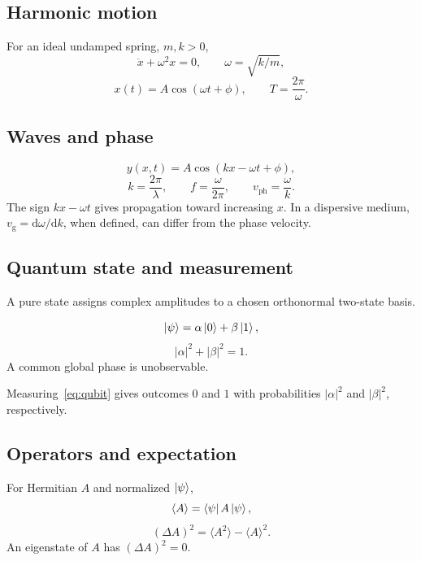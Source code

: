 \begin{referencecolumns}
\begin{referenceentry}
\section{Harmonic motion}
For an ideal undamped spring, $m,k>0$,
\[
\ddot x+\omega^2x=0,\qquad \omega=\sqrt{k/m},
\]
\[
x(t)=A\cos(\omega t+\phi),\qquad T=\frac{2\pi}{\omega}.
\]
\begin{referenceqa}
\end{referenceqa}
\end{referenceentry}

\begin{referenceentry}
\section{Waves and phase}
\[
y(x,t)=A\cos(kx-\omega t+\phi),
\]
\[
k=\frac{2\pi}{\lambda},\qquad f=\frac{\omega}{2\pi},\qquad
v_{\mathrm{ph}}=\frac{\omega}{k}.
\]
The sign $kx-\omega t$ gives propagation toward increasing $x$.
In a dispersive medium, $v_{\mathrm g}=\mathrm d\omega/\mathrm dk$, when defined,
can differ from the phase velocity.
\end{referenceentry}

\begin{referenceentry}
\section{Quantum state and measurement}
A pure state assigns complex amplitudes to a chosen orthonormal two-state basis.
\begin{referenceformula}
\begin{equation}\label{eq:qubit}
\left|\psi\right\rangle=\alpha\left|0\right\rangle+\beta\left|1\right\rangle,
\end{equation}
\[
|\alpha|^2+|\beta|^2=1.
\]
A common global phase is unobservable.
\end{referenceformula}
Measuring~\eqref{eq:qubit} gives outcomes $0$ and $1$ with probabilities
$|\alpha|^2$ and $|\beta|^2$, respectively.
\subsection{Operators and expectation}
For Hermitian $A$ and normalized $\left|\psi\right\rangle$,
\[
\langle A\rangle=\left\langle\psi\right| A\left|\psi\right\rangle,
\]
\[
(\Delta A)^2=\langle A^2\rangle-\langle A\rangle^2.
\]
An eigenstate of $A$ has $(\Delta A)^2=0$.
\end{referenceentry}


\end{referencecolumns}
